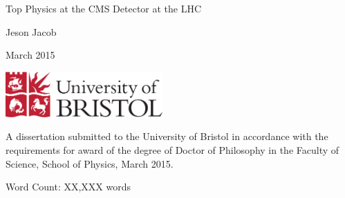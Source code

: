 \begin{titlepage}
	
	\begin{center}
		
		\vspace*{1cm}
		
		\Huge
		
		Top Physics at the CMS Detector at the LHC

		\vspace{0.5cm}
		
		\large
		
		Jeson Jacob
		
		\vspace{0.5cm}
		
		March 2015 %
		
		\vspace{0.5cm}
		
		\includegraphics[width=60mm]{Images/UnivShield}
		
		\vfill
		
		\normalsize
	\end{center}
	A dissertation submitted to the University of Bristol in accordance with the
	requirements for award of the degree of Doctor of Philosophy in the Faculty of
	Science, School of Physics, March 2015.

	\begin{flushright}
		Word Count: XX,XXX words
	\end{flushright}

\end{titlepage}